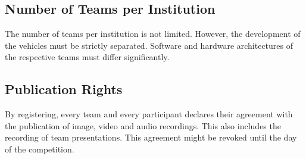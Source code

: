 \subsection{Number of Teams per Institution}

The number of teams per institution is not limited.
However, the development of the vehicles must be strictly separated. Software and hardware architectures of the respective teams must differ significantly.

\subsection{Publication Rights}

By registering, every team and every participant declares their agreement with the publication of image, video and audio recordings.
This also includes the recording of team presentations.
This agreement might be revoked until the day of the competition.


